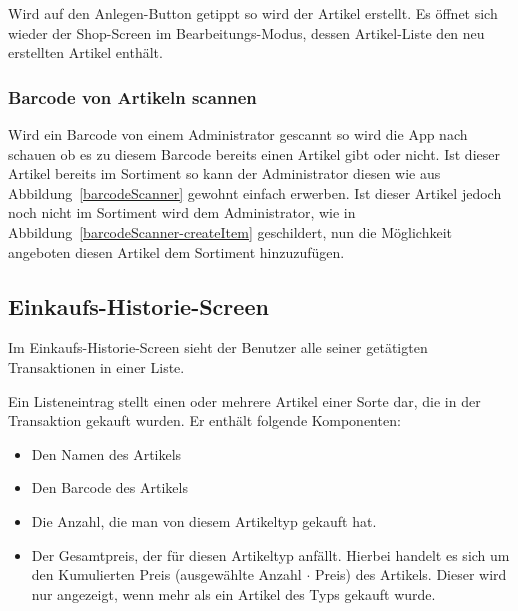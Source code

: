 Wird auf den Anlegen-Button getippt so wird der Artikel erstellt.
Es öffnet sich wieder der Shop-Screen im Bearbeitungs-Modus, dessen Artikel-Liste den neu erstellten Artikel enthält.

\subsubsection{Barcode von Artikeln scannen} \label{subsubsec:shop-admin-scan-item}

Wird ein Barcode von einem Administrator gescannt so wird die App nach schauen ob es zu diesem Barcode bereits einen Artikel gibt oder nicht.
Ist dieser Artikel bereits im Sortiment so kann der Administrator diesen wie aus Abbildung~\ref{barcodeScanner} gewohnt einfach erwerben.
Ist dieser Artikel jedoch noch nicht im Sortiment wird dem Administrator, wie in Abbildung~\ref{barcodeScanner-createItem} geschildert, nun die Möglichkeit angeboten diesen Artikel dem Sortiment hinzuzufügen.


\subsection{Einkaufs-Historie-Screen} \label{subsec:purchases-screen}

Im Einkaufs-Historie-Screen sieht der Benutzer alle seiner getätigten Transaktionen in einer Liste.

Ein Listeneintrag stellt einen oder mehrere Artikel einer Sorte dar, die in der Transaktion gekauft wurden.
Er enthält folgende Komponenten:

\begin{itemize}
	\item Den Namen des Artikels

	\item Den Barcode des Artikels

	\item Die Anzahl, die man von diesem Artikeltyp gekauft hat.

	\item Der Gesamtpreis, der für diesen Artikeltyp anfällt.
	Hierbei handelt es sich um den Kumulierten Preis (ausgewählte Anzahl $\cdot$ Preis) des Artikels.
	Dieser wird nur angezeigt, wenn mehr als ein Artikel des Typs gekauft wurde.
\end{itemize}

